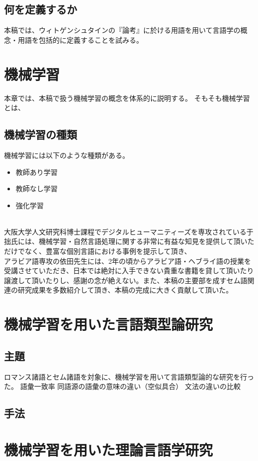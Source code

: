\documentclass[12pt, oneside]{book}
\begin{document}
\chapter{何を定義するか}
本稿では、ウィトゲンシュタインの『論考』に於ける用語を用いて言語学の概念・用語を包括的に定義することを試みる。
\chapter{}
\part{機械学習}
本章では、本稿で扱う機械学習の概念を体系的に説明する。
そもそも機械学習とは、
\chapter{機械学習の種類}
機械学習には以下のような種類がある。
\begin{itemize}
    \item 教師あり学習
    \item 教師なし学習
    \item 強化学習
\end{itemize}
\\大阪大学人文研究科博士課程でデジタルヒューマニティーズを専攻されている于拙氏には、機械学習・自然言語処理に関する非常に有益な知見を提供して頂いただけでなく、豊富な個別言語における事例を提示して頂き、
\\アラビア語専攻の依田先生には、2年の頃からアラビア語・ヘブライ語の授業を受講させていただき、日本では絶対に入手できない貴重な書籍を貸して頂いたり譲渡して頂いたりし、感謝の念が絶えない。また、本稿の主要部を成すセム語関連の研究成果を多数紹介して頂き、本稿の完成に大きく貢献して頂いた。
\part{機械学習を用いた言語類型論研究}
\chapter{主題}
ロマンス諸語とセム諸語を対象に、機械学習を用いて言語類型論的な研究を行った。
語彙一致率
同語源の語彙の意味の違い（空似具合）
文法の違いの比較
\chapter{手法}

\part{機械学習を用いた理論言語学研究}
\end{document}

